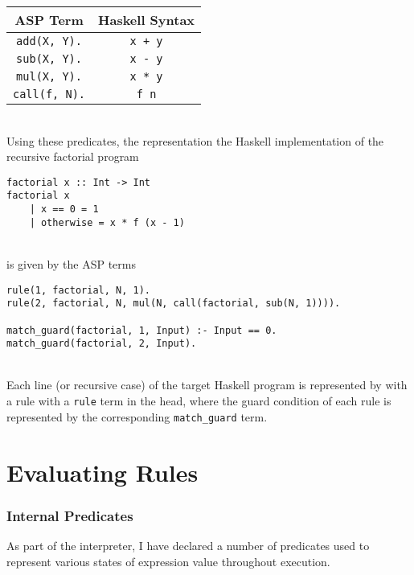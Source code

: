 \begin{center}
\begin{tabular}{| c | c |}
\hline
\textbf{ASP Term} & \textbf{Haskell Syntax} \\
\hline
\lstinline!add(X, Y).! & \lstinline!x + y! \\
\hline
\lstinline!sub(X, Y).! & \lstinline!x - y! \\
\hline
\lstinline!mul(X, Y).! & \lstinline!x * y! \\
\hline
\lstinline!call(f, N).! & \lstinline!f n! \\
\hline
\end{tabular}
\end{center}
\mbox{}\\
Using these predicates, the representation the Haskell implementation of the recursive factorial program \\
\begin{lstlisting}
factorial x :: Int -> Int
factorial x 
	| x == 0 = 1
	| otherwise = x * f (x - 1)
\end{lstlisting}
\mbox{}\\
is given by the ASP terms \\
\begin{lstlisting}
rule(1, factorial, N, 1).
rule(2, factorial, N, mul(N, call(factorial, sub(N, 1)))).

match_guard(factorial, 1, Input) :- Input == 0.
match_guard(factorial, 2, Input).
\end{lstlisting}
\mbox{}\\
Each line (or recursive case) of the target Haskell program is represented by with a rule with a \lstinline!rule! term in the head, where the guard condition of each rule is represented by the corresponding \lstinline!match_guard! term.

\section{Evaluating Rules}

\subsubsection{Internal Predicates}
As part of the interpreter, I have declared a number of predicates used to represent various states of expression value throughout execution. 
 
